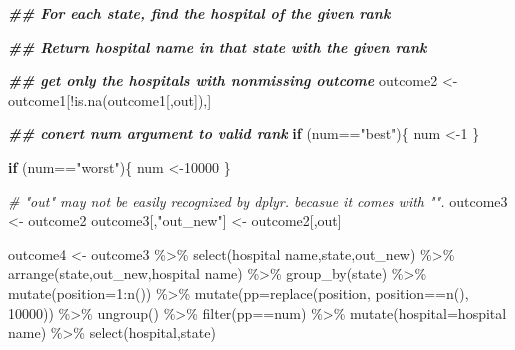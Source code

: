 \documentclass[
]{article}
\newenvironment{Shaded}{\begin{snugshade}}{\end{snugshade}}
\newcommand{\AttributeTok}[1]{\textcolor[rgb]{0.77,0.63,0.00}{#1}}
\newcommand{\CommentTok}[1]{\textcolor[rgb]{0.56,0.35,0.01}{\textit{#1}}}
\newcommand{\ControlFlowTok}[1]{\textcolor[rgb]{0.13,0.29,0.53}{\textbf{#1}}}
\newcommand{\DecValTok}[1]{\textcolor[rgb]{0.00,0.00,0.81}{#1}}
\newcommand{\DocumentationTok}[1]{\textcolor[rgb]{0.56,0.35,0.01}{\textbf{\textit{#1}}}}
\newcommand{\FunctionTok}[1]{\textcolor[rgb]{0.00,0.00,0.00}{#1}}
\newcommand{\NormalTok}[1]{#1}
\newcommand{\OtherTok}[1]{\textcolor[rgb]{0.56,0.35,0.01}{#1}}
\newcommand{\SpecialCharTok}[1]{\textcolor[rgb]{0.00,0.00,0.00}{#1}}
\newcommand{\StringTok}[1]{\textcolor[rgb]{0.31,0.60,0.02}{#1}}
\begin{document}
\begin{Shaded}
\begin{Highlighting}[]
  \DocumentationTok{\#\# For each state, find the hospital of the given rank}

            \DocumentationTok{\#\# Return hospital name in that state with the given rank}

            \DocumentationTok{\#\# get only the hospitals with nonmissing outcome}
\NormalTok{            outcome2 }\OtherTok{\textless{}{-}}\NormalTok{ outcome1[}\SpecialCharTok{!}\FunctionTok{is.na}\NormalTok{(outcome1[,out]),]}

            \DocumentationTok{\#\# conert num argument to valid rank}
            \ControlFlowTok{if}\NormalTok{ (num}\SpecialCharTok{==}\StringTok{"best"}\NormalTok{)\{}
\NormalTok{              num }\OtherTok{\textless{}{-}}\DecValTok{1}
\NormalTok{            \}}

            \ControlFlowTok{if}\NormalTok{ (num}\SpecialCharTok{==}\StringTok{"worst"}\NormalTok{)\{}
\NormalTok{              num }\OtherTok{\textless{}{-}}\DecValTok{10000}
\NormalTok{            \}}

            \CommentTok{\# "out" may not be easily recognized by dplyr. becasue it comes with "".}
\NormalTok{            outcome3 }\OtherTok{\textless{}{-}}\NormalTok{ outcome2}
\NormalTok{            outcome3[,}\StringTok{"out\_new"}\NormalTok{] }\OtherTok{\textless{}{-}}\NormalTok{ outcome2[,out]}

\NormalTok{            outcome4 }\OtherTok{\textless{}{-}}\NormalTok{ outcome3 }\SpecialCharTok{\%\textgreater{}\%}
              \FunctionTok{select}\NormalTok{(}\StringTok{\textasciigrave{}}\AttributeTok{hospital name}\StringTok{\textasciigrave{}}\NormalTok{,state,out\_new) }\SpecialCharTok{\%\textgreater{}\%}
              \FunctionTok{arrange}\NormalTok{(state,out\_new,}\StringTok{\textasciigrave{}}\AttributeTok{hospital name}\StringTok{\textasciigrave{}}\NormalTok{) }\SpecialCharTok{\%\textgreater{}\%}
              \FunctionTok{group\_by}\NormalTok{(state) }\SpecialCharTok{\%\textgreater{}\%}
              \FunctionTok{mutate}\NormalTok{(}\AttributeTok{position=}\DecValTok{1}\SpecialCharTok{:}\FunctionTok{n}\NormalTok{()) }\SpecialCharTok{\%\textgreater{}\%}
              \FunctionTok{mutate}\NormalTok{(}\AttributeTok{pp=}\FunctionTok{replace}\NormalTok{(position, position}\SpecialCharTok{==}\FunctionTok{n}\NormalTok{(), }\DecValTok{10000}\NormalTok{)) }\SpecialCharTok{\%\textgreater{}\%}
              \FunctionTok{ungroup}\NormalTok{() }\SpecialCharTok{\%\textgreater{}\%}
              \FunctionTok{filter}\NormalTok{(pp}\SpecialCharTok{==}\NormalTok{num) }\SpecialCharTok{\%\textgreater{}\%}
              \FunctionTok{mutate}\NormalTok{(}\AttributeTok{hospital=}\StringTok{\textasciigrave{}}\AttributeTok{hospital name}\StringTok{\textasciigrave{}}\NormalTok{) }\SpecialCharTok{\%\textgreater{}\%}
              \FunctionTok{select}\NormalTok{(hospital,state)}


\end{Highlighting}
\end{Shaded}
\end{document}

